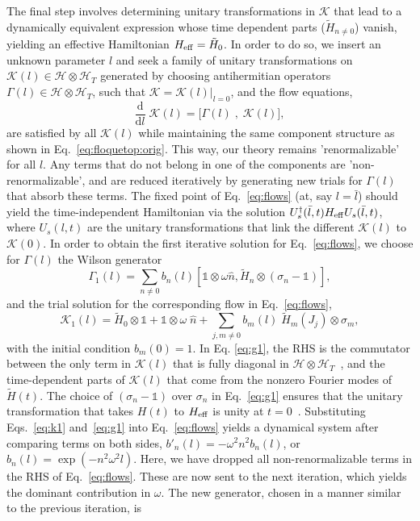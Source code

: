 \documentclass[aps,prl, notitlepage]{revtex4-1}
\begin{document}
The final step involves determining unitary transformations in $\mathcal{K}$ that lead to a dynamically equivalent expression whose time dependent parts ($\tilde{H}_{n\neq0}$) vanish, yielding an effective Hamiltonian $H_{\rm eff} = \tilde{H}_0$. In order to do so, we insert an unknown parameter $l$ and seek a family of unitary transformations on $\mathcal{K}(l)\in\mathcal{H}\otimes\mathcal{H}_T $ generated by choosing antihermitian operators $\Gamma(l)\in\mathcal{H}\otimes\mathcal{H}_T$, such that $\mathcal{K} = \mathcal{K}(l)|_{l=0}$, and the flow equations,
\begin{equation}
\label{eq:flows}
\frac{\mathrm{d}}{\mathrm{d}l}\;\mathcal{K}(l) = \bigg[\Gamma(l)\;,\;\mathcal{K}(l)\bigg],
\end{equation}
are satisfied by all $\mathcal{K}(l)$ while maintaining the same component structure as shown in Eq.~\ref{eq:floquetop:orig}. This way, our theory remains 'renormalizable' for all $l$. Any terms that do not belong in one of the components are 'non-renormalizable', and are reduced iteratively by generating new trials for $\Gamma(l)$ that absorb these terms. The fixed point of Eq.~\ref{eq:flows} (at, say $l=\bar{l}$) should yield the time-independent Hamiltonian via the solution $U^\dagger_s(\bar{l},t) H_{\rm eff} U_s(\bar{l},t)$, where $U_s(l,t)$ are the unitary transformations that link the different $\mathcal{K}(l)$ to $\mathcal{K}(0)$. In order to obtain the first iterative solution for Eq.~\ref{eq:flows}, we choose for $\Gamma(l)$ the Wilson generator~\cite{Wilson,Glazek,Mintert} 
\begin{equation}
\label{eq:g1}
\Gamma_1(l) = \sum_{n\neq 0} b_n(l) \left[\mathds{1}\otimes\omega \hat{n}, \tilde{H}_n \otimes  \left(\sigma_n-\mathds{1}\right) \right],
\end{equation}
and the trial solution for the corresponding flow in Eq.~\ref{eq:flows},
\begin{equation}
\label{eq:k1}
\mathcal{K}_1(l) = \tilde{H}_0 \otimes \mathds{1} + \mathds{1}\otimes \omega \; \hat{n}  + \sum_{j, m\neq 0}  b_m(l)\;\tilde{H}_m(J_j)  \otimes \sigma_m,
\end{equation}
with the initial condition $b_m(0)=1$. In Eq. \ref{eq:g1}, the RHS is the commutator between the only term in $\mathcal{K}(l)$ that is fully diagonal in $\mathcal{H}\otimes\mathcal{H}_T$~\cite{Glazek}, and the time-dependent parts of $\mathcal{K}(l)$ that come from the nonzero Fourier modes of $\tilde{H}(t)$. The choice of $\left(\sigma_n-\mathds{1}\right)$ over $\sigma_n$ in Eq.~\ref{eq:g1} ensures that the unitary transformation that takes $H(t)$ to $H_{\rm eff}$ is unity at $t=0$~\cite{Mintert}. Substituting Eqs.~\ref{eq:k1} and~\ref{eq:g1} into Eq.~\ref{eq:flows} yields a dynamical system after comparing terms on both sides, $b'_n(l)=-\omega^2 n^2 b_n(l)$, or $b_n(l)=\exp{\left(-n^2\omega^2 l\right)}$. Here, we have dropped all  non-renormalizable terms in the RHS of Eq.~\ref{eq:flows}. These are now sent to the next iteration, which yields the dominant contribution in $\omega$. The new generator, chosen in a manner similar to the previous iteration, is
\end{document}
